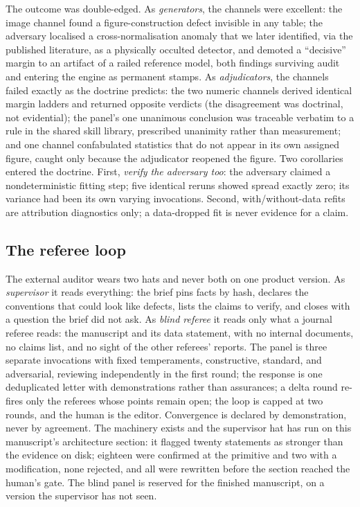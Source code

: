 The outcome was double-edged. As \emph{generators}, the channels were
excellent: the image channel found a figure-construction defect invisible
in any table; the adversary localised a cross-normalisation anomaly that we
later identified, via the published literature, as a physically occulted
detector, and demoted a ``decisive'' margin to an artifact of a railed
reference model, both findings surviving audit and entering the engine as
permanent stamps. As \emph{adjudicators}, the channels failed exactly as
the doctrine predicts: the two numeric channels derived identical margin
ladders and returned opposite verdicts (the disagreement was doctrinal, not
evidential); the panel's one unanimous conclusion was traceable verbatim to
a rule in the shared skill library, prescribed unanimity rather than
measurement; and one channel confabulated statistics that do not appear in
its own assigned figure, caught only because the adjudicator reopened the
figure. Two corollaries entered the doctrine. First, \emph{verify the
adversary too}: the adversary claimed a nondeterministic fitting step; five
identical reruns showed spread exactly zero\prov; its variance had been its
own varying invocations. Second, with/without-data refits are attribution
diagnostics only; a data-dropped fit is never evidence for a claim.

\subsection{The referee loop} \label{sec:referee}

The external auditor wears two hats and never both on one product version.
As \emph{supervisor} it reads everything: the brief pins facts by hash,
declares the conventions that could look like defects, lists the claims to
verify, and closes with a question the brief did not ask. As \emph{blind
referee} it reads only what a journal referee reads: the manuscript and its
data statement, with no internal documents, no claims list, and no sight of
the other referees' reports. The panel is three separate invocations with
fixed temperaments, constructive, standard, and adversarial, reviewing
independently in the first round; the response is one deduplicated letter
with demonstrations rather than assurances; a delta round re-fires only the
referees whose points remain open; the loop is capped at two rounds, and
the human is the editor. Convergence is declared by demonstration, never
by agreement. The machinery exists and the supervisor hat has run on this
manuscript's architecture section: it flagged twenty statements as
stronger than the evidence on disk; eighteen were confirmed at the
primitive and two with a modification, none rejected, and all were
rewritten before the section reached the human's gate. The blind
panel is reserved for the finished manuscript, on a version the supervisor
has not seen.

